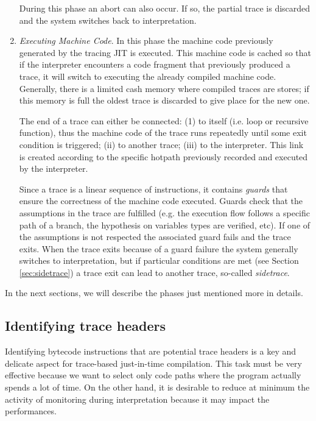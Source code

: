 \begin{enumerate}
    During this phase an abort can also occur. If so, the partial trace is discarded and the system switches back to interpretation. 
    
    \item \textit{Executing Machine Code}. In this phase the machine code previously generated by the tracing JIT is executed. This machine code is cached so that if the interpreter encounters a code fragment that previously produced a trace, it will switch to executing the already compiled machine code. Generally, there is a limited cash memory where compiled traces are stores; if this memory is full the oldest trace is discarded to give place for the new one.
    
    The end of a trace can either be connected: (1) to itself (i.e. loop or recursive function), thus the machine code of the trace runs repeatedly until some exit condition is triggered; (ii) to another trace; (iii) to the interpreter. This link is created according to the specific hotpath previously recorded and executed by the interpreter.
    
    Since a trace is a linear sequence of instructions, it contains \textit{guards} that ensure the correctness of the machine code executed. Guards check that the assumptions in the trace are fulfilled (e.g. the execution flow follows a specific path of a branch, the hypothesis on variables types are verified, etc). If one of the assumptions is not respected the associated guard fails and the trace exits. When the trace exits because of a guard failure the system generally switches to interpretation, but if particular conditions are met (see Section \ref{sec:sidetrace}) a trace exit can lead to another trace, so-called \textit{sidetrace}.
    
\end{enumerate}

\noindent
In the next sections, we will describe the phases just mentioned more in details.

\subsection{Identifying trace headers}
\label{subsec:identiy-trace-headers}
Identifying bytecode instructions that are potential trace headers is a key and delicate aspect for trace-based just-in-time compilation. This task must be very effective because we want to select only code paths where the program actually spends a lot of time. On the other hand, it is desirable to reduce at minimum the activity of monitoring during interpretation because it may impact the performances.

